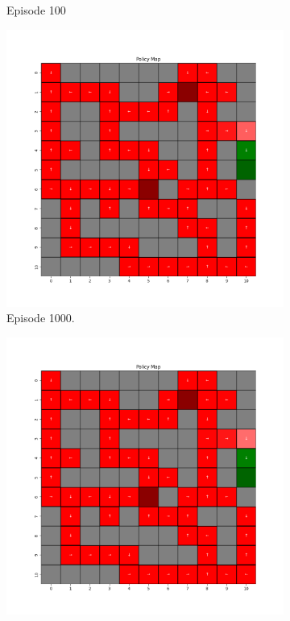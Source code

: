 \documentclass{assignment}
\begin{document}
\begin{figure}[H]
\begin{subfigure}{0.3\textwidth}
    \caption{Episode 100}
    \end{subfigure}
    \begin{subfigure}{0.3\textwidth}
        \includegraphics[width=\textwidth]{figures/policy_q/gamma_sweep/policy_alpha_0.1_gamma_0.25_epsilon_0.2_iteration_1000.png}
    \caption{Episode 1000.}
    \end{subfigure}\hfill
    \begin{subfigure}{0.3\textwidth}
        \includegraphics[width=\textwidth]{figures/policy_q/gamma_sweep/policy_alpha_0.1_gamma_0.25_epsilon_0.2_iteration_5000.png}

\end{subfigure}
\end{figure}
\end{document}
